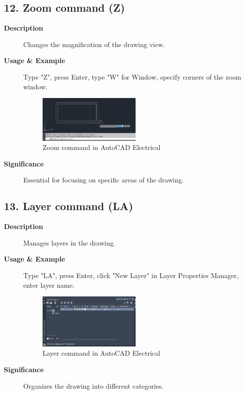 \documentclass[12pt]{article}
\begin{document}
\subsection*{12. Zoom command (Z)}
\begin{description}
    \item [\textbf{Description}] Changes the magnification of the drawing view.
    \item [\textbf{Usage \& Example}] Type "Z", press Enter, type "W" for Window, specify corners of the zoom window.
          \begin{figure}[H]
              \centering
              \includegraphics[width=0.5\textwidth]{zoom_command.png}
              \caption{Zoom command in AutoCAD Electrical}
          \end{figure}
    \item [\textbf{Significance}] Essential for focusing on specific areas of the drawing.
\end{description}

\subsection*{13. Layer command (LA)}
\begin{description}
    \item [\textbf{Description}] Manages layers in the drawing.
    \item [\textbf{Usage \& Example}] Type "LA", press Enter, click "New Layer" in Layer Properties Manager, enter layer name.
          \begin{figure}[H]
              \centering
              \includegraphics[width=0.5\textwidth]{layer_command.png}
              \caption{Layer command in AutoCAD Electrical}
          \end{figure}
    \item [\textbf{Significance}] Organizes the drawing into different categories.
\end{description}
\end{document}
